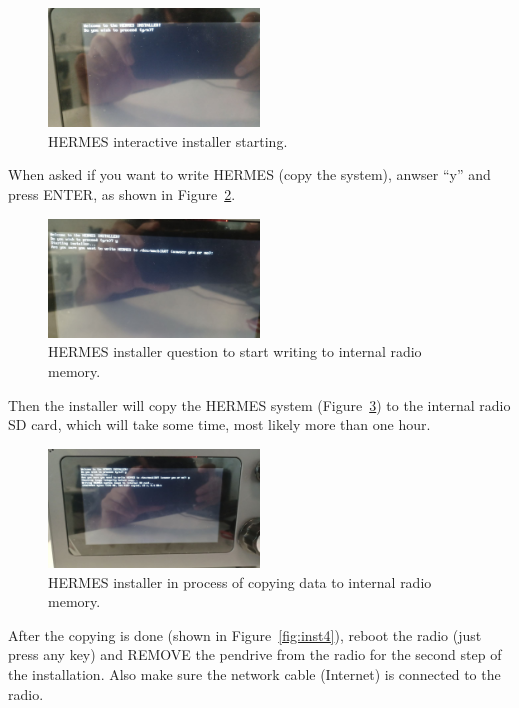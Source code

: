 \documentclass[11pt,a4paper]{article}
\begin{document}
\begin{figure}[H]
  \centering
  \includegraphics[width=0.5\textwidth]{pictures/inst-1.jpg}
  \caption{HERMES interactive installer starting.}
  \label{fig:inst1}
\end{figure}

When asked if you want to write HERMES (copy the system), anwser ``y'' and press ENTER, as shown in Figure~\ref{fig:inst2}.

\begin{figure}[H]
  \centering
  \includegraphics[width=0.5\textwidth]{pictures/inst-2.jpg}
  \caption{HERMES installer question to start writing to internal radio memory.}
  \label{fig:inst2}
\end{figure}

Then the installer will copy the HERMES system (Figure~\ref{fig:inst3}) to the internal radio SD card, which will take some time, most likely more than one hour.

\begin{figure}[H]
  \centering
  \includegraphics[width=0.5\textwidth]{pictures/inst-3.jpg}
  \caption{HERMES installer in process of copying data to internal radio memory.}
  \label{fig:inst3}
\end{figure}

After the copying is done (shown in Figure~\ref{fig:inst4}), reboot the radio (just press any key) and REMOVE the pendrive from the radio
for the second step of the installation. Also make sure the network cable (Internet) is connected to the radio.
\end{document}
